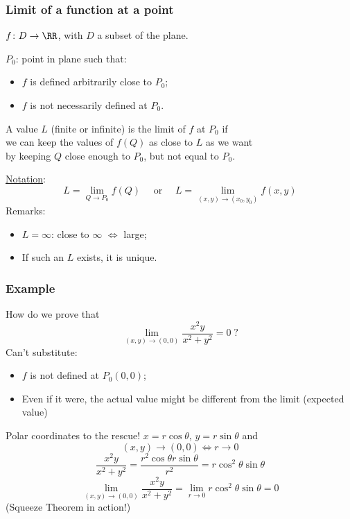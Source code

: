 \begin{frame}
\frametitle{Limit of a function at a point}
  $f\colon D \to \RR$, with $D$ a subset of the plane.

  $P_0$: point in plane such that:
  \begin{itemize}
    \item $f$ is defined arbitrarily close to $P_0$;
    \item $f$ is not necessarily defined at $P_0$.
  \end{itemize}

  \begin{definition}
    A value $L$ (finite or infinite) is
    \textcolor[rgb]{0.98,0.00,0.00}{the limit of $f$ at $P_0$} if \\
    we can keep the values of $f(Q)$ as close to $L$ as we want \\
    by keeping $Q$ close enough to $P_0$, but not equal to $P_0$.
  \end{definition}

  \underline{Notation}:
  $$L = \lim_{Q\to P_0} f(Q) \quad \text{ or } \quad
  L = \lim_{(x,y) \to (x_0,y_0)} f(x,y)$$
  \pause
  Remarks:
  \begin{itemize}
    \item $L=\infty$: close to $\infty$ $\Longleftrightarrow$ large;
    \item If such an $L$ exists, it is unique.
  \end{itemize}

\end{frame}

\begin{frame}
  \frametitle{Example}

  How do we prove that
  $$\lim_{(x,y) \to (0,0)} \frac{x^2y}{x^2+y^2} =0 \; ?$$
  \pause
  Can't substitute:
  \begin{itemize}
    \item $f$ is not defined at $P_0(0,0)$;
    \item Even if it were, the actual value might be different from the limit (expected value)
  \end{itemize}
  \pause
  Polar coordinates to the rescue!
  $x=r\cos\theta$, $y =r \sin\theta$ and
  $$(x,y) \to (0,0) \Longleftrightarrow r\to 0$$
  $$\frac{x^2y}{x^2+y^2} = \frac{r^2\cos\theta r\sin\theta}{r^2} = r\cos^2{\theta}\sin\theta$$
  $$\lim_{(x,y) \to (0,0)} \frac{x^2y}{x^2+y^2} = \lim_{r\to 0} r\cos^2{\theta}\sin\theta = 0$$
  \pause (Squeeze Theorem in action!)
\end{frame}

